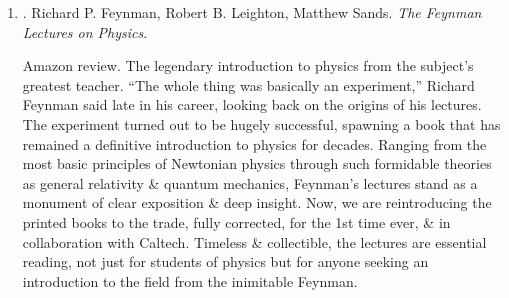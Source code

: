 \documentclass{article}
\begin{document}
\begin{enumerate}
	{\sf Editorial reviews.}
	\begin{itemize}
		\item ``1 of the greatest minds of the 20th century.'' -- {\it New York Review of Books}
		\item ``The essence of physics \& {\sc Feynman}. No jargon\footnote{words or expressions that are used by a particular profession or group of people, \& are difficult for others to understand. tiếng lóng.}, just ideas, excitement, \& the straight dope. \& real answers, like `we don't know.''' -- {\sc Stephen Wolfram}
		\item ``The most original mind of his generation.'' -- {\sc Freeman Dyson}
		\item ``If 1 book was all that could be passed onto the next generation of scientists it would undoubtedly have to be {\it6 Easy Pieces}.'' -- {\sc John Gribbin}, {\it New Scientist}
	\end{itemize}
	{\sf About the Author.} {\sc Richard P. Feynman} (1918--1988) was the Richard Chace Tolman Professor of Theoretical Physics at the California Institute of Technology. He was awarded the 1965 Nobel Prize for his work on the development of quantum field theory. He was also 1 of the most famous \& beloved figures of the 20th century, both in physics \& in the public arena.
	
	\item \cite{Feyman_Leighton_Sands_lecture_physics}. {\sc Richard P. Feynman, Robert B. Leighton, Matthew Sands}. {\it The Feynman Lectures on Physics}. {}
	
	{\sf Amazon review.} The legendary introduction to physics from the subject's greatest teacher. ``The whole thing was basically an experiment,'' {\sc Richard Feynman} said late in his career, looking back on the origins of his lectures. The experiment turned out to be hugely successful, spawning a book that has remained a definitive introduction to physics for decades. Ranging from the most basic principles of Newtonian physics through such formidable theories as general relativity \& quantum mechanics, {\sc Feynman}'s lectures stand as a monument of clear exposition \& deep insight. Now, we are reintroducing the printed books to the trade, fully corrected, for the 1st time ever, \& in collaboration with Caltech. Timeless \& collectible, the lectures are essential reading, not just for students of physics but for anyone seeking an introduction to the field from the inimitable {\sc Feynman}.
	

\end{enumerate}
\end{document}
